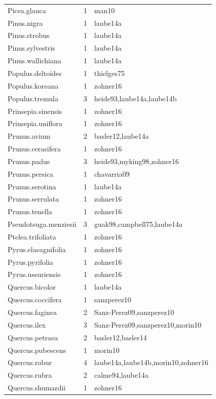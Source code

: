 \documentclass{article}
\begin{document}
\begin{footnotesize}
\begin{table}[ht]
\begin{tabular}{|p{}|p{}|p{}|}
  Picea.glauca &   1 & man10 \\ 
  Pinus.nigra &   1 & laube14a \\ 
  Pinus.strobus &   1 & laube14a \\ 
  Pinus.sylvestris &   1 & laube14a \\ 
  Pinus.wallichiana &   1 & laube14a \\ 
  Populus.deltoides &   1 & thielges75 \\ 
  Populus.koreana &   1 & zohner16 \\ 
  Populus.tremula &   3 & heide93,laube14a,laube14b \\ 
  Prinsepia.sinensis &   1 & zohner16 \\ 
  Prinsepia.uniflora &   1 & zohner16 \\ 
  Prunus.avium &   2 & basler12,laube14a \\ 
  Prunus.cerasifera &   1 & zohner16 \\ 
  Prunus.padus &   3 & heide93,myking98,zohner16 \\ 
  Prunus.persica &   1 & chavarria09 \\ 
  Prunus.serotina &   1 & laube14a \\ 
  Prunus.serrulata &   1 & zohner16 \\ 
  Prunus.tenella &   1 & zohner16 \\ 
  Pseudotsuga.menziesii &   3 & guak98,campbell75,laube14a \\ 
  Ptelea.trifoliata &   1 & zohner16 \\ 
  Pyrus.elaeagnifolia &   1 & zohner16 \\ 
  Pyrus.pyrifolia &   1 & zohner16 \\ 
  Pyrus.ussuriensis &   1 & zohner16 \\ 
  Quercus.bicolor &   1 & laube14a \\ 
  Quercus.coccifera &   1 & sanzperez10 \\ 
  Quercus.faginea &   2 & Sanz-Perez09,sanzperez10 \\ 
  Quercus.ilex &   3 & Sanz-Perez09,sanzperez10,morin10 \\ 
  Quercus.petraea &   2 & basler12,basler14 \\ 
  Quercus.pubescens &   1 & morin10 \\ 
  Quercus.robur &   4 & laube14a,laube14b,morin10,zohner16 \\ 
  Quercus.rubra &   2 & calme94,laube14a \\ 
  Quercus.shumardii &   1 & zohner16 \\ 

\end{tabular}
\end{table}
\end{footnotesize}
\end{document}
